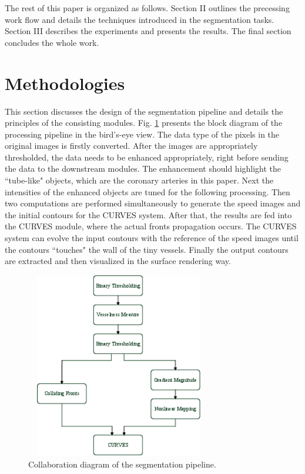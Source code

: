 The rest of this paper is organized as follows.
Section II outlines the precessing work flow and details the techniques introduced in the segmentation tasks.
Section III describes the experiments and presents the results.
The final section concludes the whole work.

\section{Methodologies}

This section discusses the design of the segmentation pipeline and details the principles of the consisting modules.
Fig. \ref{fig:DataFlow} presents the block diagram of the processing pipeline in the bird's-eye view.
The data type of the pixels in the original images is firstly converted.
After the images are appropriately thresholded, the data needs to be enhanced appropriately, right before sending the data to the downstream modules.
The enhancement should highlight the ``tube-like" objects, which are the coronary arteries in this paper.
Next the intensities of the enhanced objects are tuned for the following processing.
Then two computations are performed simultaneously to generate the speed images and the initial contours for the CURVES system.
After that, the results are fed into the CURVES module, where the actual fronts propagation occurs.
The CURVES system can evolve the input contours with the reference of the speed images until the contours ``touches" the wall of the tiny vessels.
Finally the output contours are extracted and then visualized in the surface rendering way.
\begin{figure}[t]
\centering
\includegraphics[height=3.2in,width=3.2in]{Figures/chap04/DataFlow.png}
\caption{Collaboration diagram of the segmentation pipeline.}
\label{fig:DataFlow}
\end{figure}

